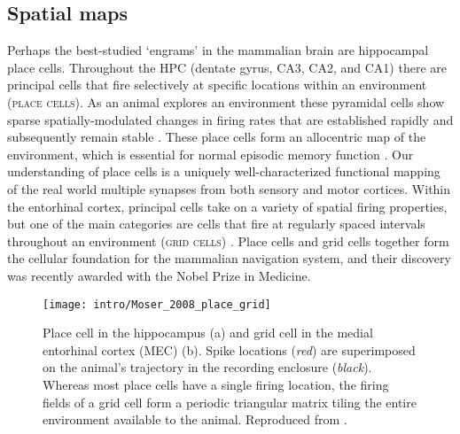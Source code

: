 \subsection{Spatial maps}\label{sec:intro:memory:spatial_maps}
Perhaps the best-studied `engrams' in the mammalian brain are hippocampal place cells.
Throughout the \ac{HPC} (dentate gyrus, CA3, CA2, and CA1) there are principal cells that fire selectively at specific locations within an environment (\textsc{place cells}).
As an animal explores an environment these pyramidal cells show sparse spatially-modulated changes in firing rates that are established rapidly and subsequently remain stable \citep{O'Keefe1971}\citep{Thompson1990}\citep{Frank2004}.
These place cells form an allocentric map of the environment, which is essential for normal episodic memory function \citep{Smith2006c}\citep{Nakazawa2004}\citep{Buzsaki2013}.
Our understanding of place cells is a uniquely well-characterized functional mapping of the real world multiple synapses from both sensory and motor cortices.
Within the entorhinal cortex, principal cells take on a variety of spatial firing properties, but one of the main categories are cells that fire at regularly spaced intervals throughout an environment (\textsc{grid cells}) \citep{Hafting2005, Moser2014a}.
Place cells and grid cells together form the cellular foundation for the mammalian navigation system, and their discovery was recently awarded with the Nobel Prize in Medicine.

\begin{figure}
	\centering
	\texttt{[image: intro/Moser\_2008\_place\_grid]}
	\caption[Place cell in the hippocampus and grid cell in the MEC]{Place cell in the hippocampus (a) and grid cell in the medial entorhinal cortex (MEC) (b).
	Spike locations (\emph{red}) are superimposed on the animal’s trajectory in the recording enclosure (\emph{black}).
	Whereas most place cells have a single firing location, the firing fields of a grid cell form a periodic triangular matrix tiling the entire environment available to the animal.
	Reproduced from \citet{Moser2008}.}
	\label{fig:intro:memory:place_grid}
\end{figure}

